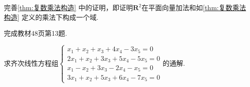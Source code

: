 \begin{exercise}

    \begin{exgroup}
        \item 完善\autoref{thm:复数乘法构造} 中的证明，即证明$\mathbf{R}^2$在平面向量加法和如\autoref*{thm:复数乘法构造} 定义的乘法下构成一个域.

        \item 完成教材48页第13题.

        \item 求齐次线性方程组$\begin{cases}
                x_1+x_2+x_3+4x_4-3x_5=0   \\
                2x_1+x_2+3x_3+5x_4-5x_5=0 \\
                x_1-x_2+3x_3-2x_4-x_5=0   \\
                3x_1+x_2+5x_3+6x_4-7x_5=0
            \end{cases}$的通解.


\end{exgroup}
\end{exercise}
